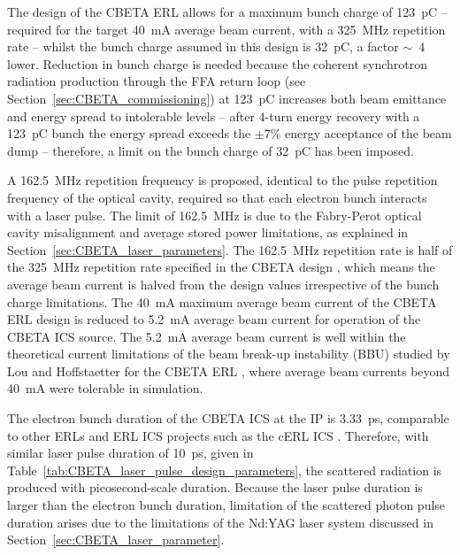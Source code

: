 \documentclass[../main.tex]{subfiles}
\begin{document}
The design of the CBETA ERL \cite{hoffstaetter2017cbeta} allows for a maximum bunch charge of 123~\si{\pico\coulomb} -- required for the target 40~\si{\milli\ampere} average beam current, with a 325~\si{\mega\hertz} repetition rate -- whilst the bunch charge assumed in this design is 32~\si{\pico\coulomb}, a factor $\sim$~4 lower. Reduction in bunch charge is needed because the coherent synchrotron radiation production through the FFA return loop (see Section~\ref{sec:CBETA_commissioning}) at 123~\si{\pico\coulomb} increases both beam emittance and energy spread to intolerable levels -- after 4-turn energy recovery with a 123~\si{\pico\coulomb} bunch the energy spread exceeds the $\pm 7$\% energy acceptance of the beam dump \cite{lou2020coherent} -- therefore, a limit on the bunch charge of 32~\si{\pico\coulomb} has been imposed. 

A 162.5~\si{\mega\hertz} repetition frequency is proposed, identical to the pulse repetition frequency of the optical cavity, required so that each electron bunch interacts with a laser pulse. The limit of 162.5~\si{\mega\hertz} is due to the Fabry-Perot optical cavity misalignment and average stored power limitations, as explained in Section~\ref{sec:CBETA_laser_parameters}. The 162.5~\si{\mega\hertz} repetition rate is half of the 325~\si{\mega\hertz} repetition rate specified in the CBETA design \cite{hoffstaetter2017cbeta}, which means the average beam current is halved from the design values irrespective of the bunch charge limitations. The  40~\si{\milli\ampere} maximum average beam current of the CBETA ERL design is reduced to 5.2~\si{\milli\ampere} average beam current for operation of the CBETA ICS source. The 5.2~\si{\milli\ampere} average beam current is well within the theoretical current limitations of the beam break-up instability (BBU) studied by Lou and Hoffstaetter for the CBETA ERL \cite{lou2019beam}, where average beam currents beyond 40~\si{\milli\ampere} were tolerable in simulation.   

The electron bunch duration of the CBETA ICS at the IP is 3.33~\si{\pico\second}, comparable to other ERLs \cite{angal2018perle} and ERL ICS projects such as the cERL ICS \cite{akagi2016narrow}. Therefore, with similar laser pulse duration of 10~\si{\pico\second}, given in Table~\ref{tab:CBETA_laser_pulse_design_parameters}, the scattered radiation is produced with picosecond-scale duration. Because the laser pulse duration is larger than the electron bunch duration, limitation of the scattered photon pulse duration arises due to the limitations of the Nd:YAG laser system discussed in Section~\ref{sec:CBETA_laser_parameter}.
\end{document}
